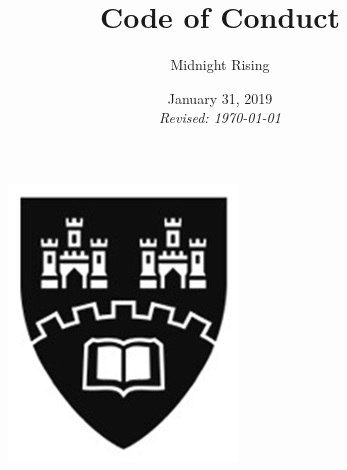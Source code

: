 \documentclass[11pt]{article}
\begin{document}

\begin{figure}[t]
	\includegraphics[scale=0.75]{northumbria_logo.jpg}
	\centering
\end{figure}	
\title{Code of Conduct}
\author{Midnight Rising}
\date{
	January 31, 2019\\
	\small \textit{Revised: \today}
}
\maketitle

\newpage

%	
\end{document}

